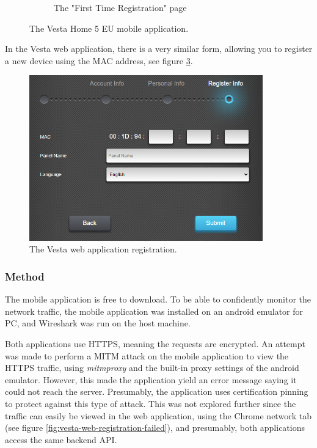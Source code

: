\begin{figure}[!ht]
\begin{subfigure}[t]{0.4\textwidth}
        \caption{The "First Time Registration" page}
        \label{fig:vesta-registration-page}
    \end{subfigure}
    \caption{The Vesta Home 5 EU mobile application.}
    \label{fig:vesta-home-app}
\end{figure}
In the Vesta web application, there is a very similar form, allowing you to register a new device using the MAC address, see figure \ref{fig:vesta-web-registration}.
\begin{figure}[!ht]
    \centering
    \includegraphics[width=0.9\textwidth]{images/6-pentesting/vesta-web-registration.png}
    \caption{The Vesta web application registration.}
    \label{fig:vesta-web-registration}
\end{figure}

\subsubsection{Method}
The mobile application is free to download. To be able to confidently monitor the network traffic, the mobile application was installed on an android emulator for PC, and Wireshark was run on the host machine.

Both applications use HTTPS, meaning the requests are encrypted. An attempt was made to perform a \gls{MITM} attack on the mobile application to view the HTTPS traffic, using \textit{mitmproxy} and the built-in proxy settings of the android emulator. However, this made the application yield an error message saying it could not reach the server. Presumably, the application uses certification pinning to protect against this type of attack. This was not explored further since the traffic can easily be viewed in the web application, using the Chrome network tab (see figure \ref{fig:vesta-web-registration-failed}), and presumably, both applications access the same backend API.

